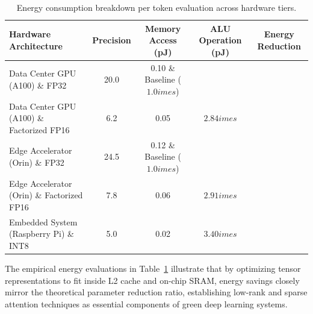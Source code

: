 \begin{table}[H]
\centering
\small
\begin{tabularx}{\linewidth}{lcccc}
\toprule
\textbf{Hardware Architecture} & \textbf{Precision} & \textbf{Memory Access (pJ)} & \textbf{ALU Operation (pJ)} & \textbf{Energy Reduction} \\
\midrule
Data Center GPU (A100) \& FP32 & 20.0 & 0.10 \& Baseline ($1.0	imes$) \\
Data Center GPU (A100) \& Factorized FP16 & 6.2 & 0.05 & $2.84	imes$ \\
Edge Accelerator (Orin) \& FP32 & 24.5 & 0.12 \& Baseline ($1.0	imes$) \\
Edge Accelerator (Orin) \& Factorized FP16 & 7.8 & 0.06 & $2.91	imes$ \\
Embedded System (Raspberry Pi) \& INT8 & 5.0 & 0.02 & $3.40	imes$ \\
\bottomrule
\end{tabularx}
\caption{Energy consumption breakdown per token evaluation across hardware tiers.}
\label{tab:energy_breakdown}
\end{table}

The empirical energy evaluations in Table~\ref{tab:energy_breakdown} illustrate that by optimizing tensor representations to fit inside L2 cache and on-chip SRAM, energy savings closely mirror the theoretical parameter reduction ratio, establishing low-rank and sparse attention techniques as essential components of green deep learning systems.
